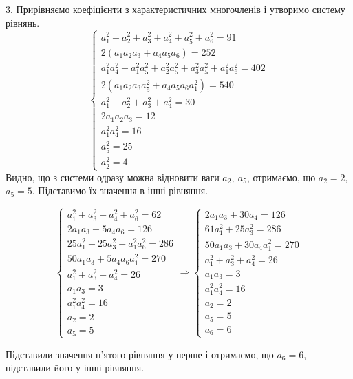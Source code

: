 3. Прирівняємо коефіцієнти з характеристичних многочленів і утворимо систему рівнянь.
\begin{equation*}
    \begin{cases}
a_1^2+a_2^2+a_3^2+a_4^2+a_5^2+a_6^2 = 91\\
2(a_1a_2a_3 + a_4a_5a_6) = 252\\
a_1^2a_4^2+a_1^2a_5^2+a_2^2a_5^2+a_3^2a_5^2+a_1^2a_6^2 = 402\\
2(a_1a_2a_3a_5^2 +a_4a_5a_6a_1^2) = 540\\
a_1^2+a_2^2+a_3^2+a_4^2 = 30\\
2a_1a_2a_3 = 12\\
a_1^2a_4^2 = 16\\
a_5^2 = 25\\
a_2^2 = 4
\end{cases}
\end{equation*}
Видно, що з системи одразу можна відновити ваги $a_2,\ a_5$, отримаємо, що $a_2=2$, $a_5=5$. Підставимо їх значення в інші рівняння.

\begin{equation*}
    \begin{cases}
a_1^2+a_3^2+a_4^2+a_6^2 = 62\\
2a_1a_3 + 5a_4a_6 = 126\\
25a_1^2+25a_3^2+a_1^2a_6^2 = 286\\
50a_1a_3 + 5a_4a_6a_1^2 = 270\\
a_1^2+a_3^2+a_4^2 = 26\\
a_1a_3 = 3\\
a_1^2a_4^2 = 16\\
a_2 = 2\\
a_5 = 5
\end{cases}
\Rightarrow
\begin{cases}
2a_1a_3 + 30a_4 = 126\\
61a_1^2+25a_3^2 = 286\\
50a_1a_3 + 30a_4a_1^2 = 270\\
a_1^2+a_3^2+a_4^2 = 26\\
a_1a_3 = 3\\
a_1^2a_4^2 = 16\\
a_2 = 2\\
a_5 = 5\\
a_6 = 6
\end{cases}
\end{equation*}

Підставили значення п'ятого рівняння у перше і отримаємо, що $a_6=6$, підставили його у інші рівняння.

